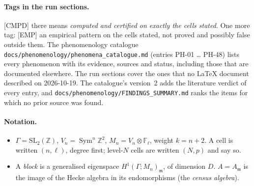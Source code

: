 \documentclass[11pt]{article}
\newcommand{\Z}{\mathbb{Z}}
\newcommand{\Fl}{\mathbb{F}_\ell}
\newcommand{\m}{\mathfrak{m}}
\newcommand{\Sym}{\operatorname{Sym}}
\newcommand{\SL}{\mathrm{SL}}
\newcommand{\Ga}{\Gamma}
\newcommand{\pfile}[1]{\nolinkurl{#1}}
\newcommand{\CMPD}{\textsf{\small[CMPD]}}
\newcommand{\EMP}{\textsf{\small[EMP]}}
\begin{document}
\paragraph{Tags in the run sections.} \CMPD{} there means \emph{computed and certified on exactly the cells stated}. One more tag: \EMP{} an empirical
pattern on the cells stated, not proved and possibly false outside them. The phenomenology catalogue
\pfile{docs/phenomenology/phenomena_catalogue.md} (entries PH-01 \dots{} PH-48) lists every phenomenon with its evidence, sources and status,
including those that are documented elsewhere. The run sections cover the ones that no LaTeX document described on 2026-10-19. The catalogue's
version~2 adds the literature verdict of every entry, and \pfile{docs/phenomenology/FINDINGS_SUMMARY.md} ranks the items for which no prior
source was found.

\paragraph{Notation.}
\begin{itemize}[leftmargin=1.6em,itemsep=1pt]
\item $\Ga=\SL_2(\Z)$, $V_n=\Sym^{n}\Z^{2}$, $M_n=V_n\otimes\Fl$, weight $k=n+2$. A cell is written $(n,\ell)$, degree first; level-$N$ cells
  are written $(N,p)$ and say so.
\item A \emph{block} is a generalised eigenspace $H^{1}(\Ga;M_n)_\m$, of dimension $D$. $A=A_\m$ is the image of the Hecke algebra in its
  endomorphisms (the \emph{census algebra}).
\end{itemize}
\end{document}
